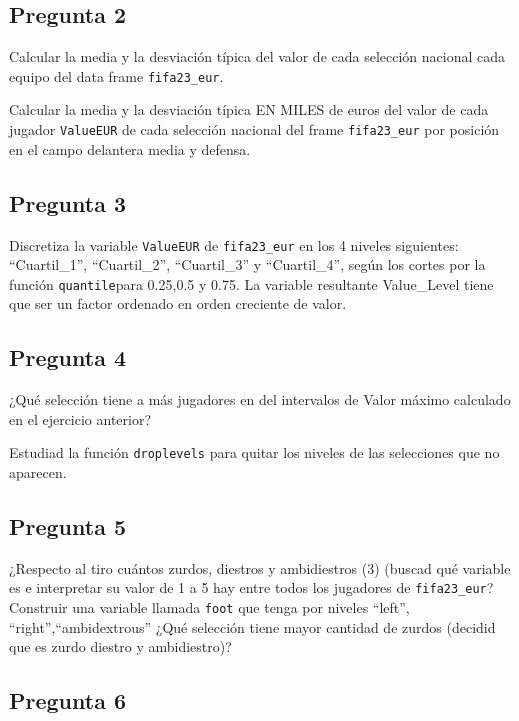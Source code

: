 \documentclass[
]{article}
\begin{document}
\hypertarget{pregunta-2}{%
\subsection{Pregunta 2}\label{pregunta-2}}

Calcular la media y la desviación típica del valor de cada selección
nacional cada equipo del data frame \texttt{fifa23\_eur}.

Calcular la media y la desviación típica EN MILES de euros del valor de
cada jugador \texttt{ValueEUR} de cada selección nacional del frame
\texttt{fifa23\_eur} por posición en el campo delantera media y defensa.

\hypertarget{pregunta-3}{%
\subsection{Pregunta 3}\label{pregunta-3}}

Discretiza la variable \texttt{ValueEUR} de \texttt{fifa23\_eur} en los
4 niveles siguientes: ``Cuartil\_1'', ``Cuartil\_2'', ``Cuartil\_3'' y
``Cuartil\_4'', según los cortes por la función \texttt{quantile}para
0.25,0.5 y 0.75. La variable resultante Value\_Level tiene que ser un
factor ordenado en orden creciente de valor.

\hypertarget{pregunta-4}{%
\subsection{Pregunta 4}\label{pregunta-4}}

¿Qué selección tiene a más jugadores en del intervalos de Valor máximo
calculado en el ejercicio anterior?

Estudiad la función \texttt{droplevels} para quitar los niveles de las
selecciones que no aparecen.

\hypertarget{pregunta-5}{%
\subsection{Pregunta 5}\label{pregunta-5}}

¿Respecto al tiro cuántos zurdos, diestros y ambidiestros (3) (buscad
qué variable es e interpretar su valor de 1 a 5 hay entre todos los
jugadores de \texttt{fifa23\_eur}? Construir una variable llamada
\texttt{foot} que tenga por niveles ``left'', ``right'',``ambidextrous''
¿Qué selección tiene mayor cantidad de zurdos (decidid que es zurdo
diestro y ambidiestro)?

\hypertarget{pregunta-6}{%
\subsection{Pregunta 6}\label{pregunta-6}}
\end{document}
